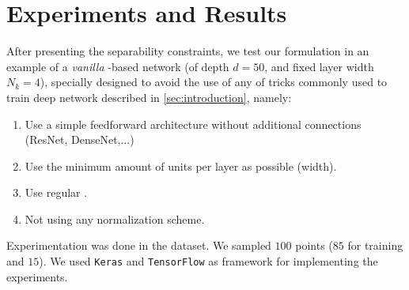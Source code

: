 
\section{Experiments and Results}\label{sec:experiments}
After presenting the separability constraints, we test our formulation in an example of a \emph{vanilla} \ReLU-based network (of depth $d=50$, and fixed layer width $N_k=4$), specially designed to avoid the use of any of tricks commonly used to train deep network described in \ref{sec:introduction}, namely: 
\begin{enumerate}
    \item Use a simple feedforward architecture without additional connections (ResNet, DenseNet,...)
    \item Use the minimum amount of units per layer as possible (width).
    \item Use regular \ReLU.
    \item Not using any normalization scheme.
\end{enumerate}
Experimentation was done in the \moons dataset. We sampled $100$ points ($85$ for training and $15$). We used \texttt{Keras}\cite{keras} and \texttt{TensorFlow}\cite{tensorflow} as framework for implementing the experiments.

